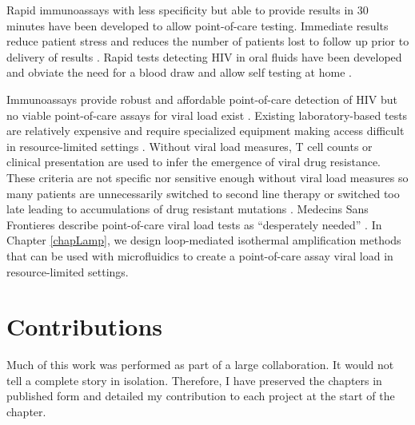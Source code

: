 \documentclass[../sherrill-Mix_thesis.tex]{subfiles}
\begin{document}
	Rapid immunoassays with less specificity but able to provide results in 30 minutes have been developed to allow point-of-care testing. Immediate results reduce patient stress and reduces the number of patients lost to follow up prior to delivery of results \citep{Kassler1995,CDCP1998,CDCP2002}. Rapid tests detecting HIV in oral fluids have been developed and obviate the need for a blood draw \citep{Gallo1997,Delaney2006,SemaBaltazar2014} and allow self testing at home \citep{Granade2004,PantPai2013}.


	Immunoassays provide robust and affordable point-of-care detection of HIV but no viable point-of-care assays for viral load exist \citep{Usdin2010}. Existing laboratory-based tests are relatively expensive and require specialized equipment making access difficult in resource-limited settings \citep{Fiscus2006,Wang2010a}. Without viral load measures, \cdFour{} T cell counts or clinical presentation are used to infer the emergence of viral drug resistance. These criteria are not specific nor sensitive enough without viral load measures so many patients are unnecessarily switched to second line therapy \citep{Mee2008,VanOosterhout2009} or switched too late leading to accumulations of drug resistant mutations \citep{Hosseinipour2009}. Medecins Sans Frontieres describe point-of-care viral load tests as ``desperately needed'' \citep{Usdin2010}. In Chapter \ref{chapLamp}, we design loop-mediated isothermal amplification methods that can be used with microfluidics to create a point-of-care assay viral load in resource-limited settings.

\section{Contributions}
	Much of this work was performed as part of a large collaboration. It would not tell a complete story in isolation. Therefore, I have preserved the chapters in published form and detailed my contribution to each project at the start of the chapter.
\end{document}
